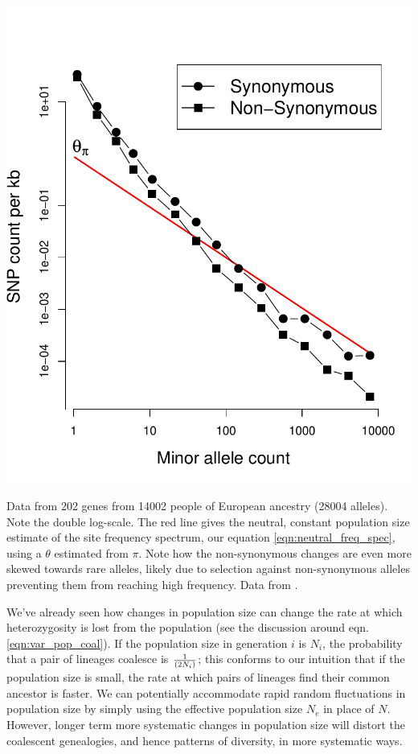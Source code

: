 \begin{marginfigure}
\begin{center}
  \includegraphics[width = \textwidth]{Journal_figs/genetic_drift/human_pop_growth/Nelson_pop_growth.pdf}
\end{center}
\caption{Data from 202 genes from 14002 people of European ancestry (28004 alleles). Note
  the double log-scale. The red
  line gives the neutral, constant population size estimate of the site frequency spectrum, our equation \eqref{eqn:neutral_freq_spec}, using a  $\theta$ estimated from $\pi$. Note how the non-synonymous changes are even more skewed towards rare alleles, likely due to selection against non-synonymous alleles preventing them from reaching high frequency. Data from \citet{nelson:12}.  } \label{fig:Human_growth}
\end{marginfigure}
We've already seen how changes in population size can change the rate
at which heterozygosity is lost from the population (see the
discussion around eqn. \eqref{eqn:var_pop_coal}). If the population
size in generation $i$ is $N_i$, the probability that a pair of
lineages coalesce is $\nicefrac{1}{(2N_i)}$; this conforms to our
intuition that if the population size is small, the rate at which
pairs of lineages find their common ancestor is faster. We can potentially accommodate rapid random fluctuations in population size by simply using the effective population size $N_e$ in place of $N$. However,
longer term more systematic changes in population size will distort
the coalescent genealogies, and hence patterns of diversity, in more
systematic ways.

